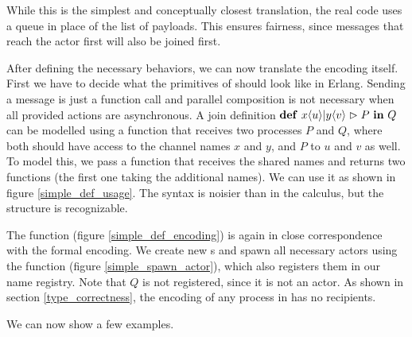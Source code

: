 
While this is the simplest and conceptually closest translation,
the real code uses a queue in place of the list of payloads.
This ensures fairness, since messages that reach the actor first
will also be joined first.


After defining the necessary behaviors,
we can now translate the encoding itself.
First we have to decide what the primitives of \joincalc should look like
in Erlang.
Sending a message is just a function call and parallel composition
is not necessary when all provided actions are asynchronous.
A join definition
$\textbf{\textup{def}} \ x\langle u\rangle | y\langle v\rangle \vartriangleright P \ \textbf{\textup{in}} \ Q$
can be modelled using a function that receives two processes $P$ and $Q$,
where both should have access to the channel names $x$ and $y$,
and $P$ to $u$ and $v$ as well.
To model this, we pass a function that receives the shared names and
returns two functions (the first one taking the additional names).
We can use it as shown in figure \ref{simple_def_usage}.
The syntax is noisier than in the calculus, but the structure is recognizable.


The  function (figure \ref{simple_def_encoding})
is again in close correspondence with the formal encoding.
We create new \actorname{}s and spawn all necessary actors
using the  function (figure \ref{simple_spawn_actor}),
which also registers them in our name registry.
Note that $Q$ is not registered, since it is not an actor.
As shown in section \ref{type_correctness},
the encoding of any process in \joincalc has no recipients.



We can now show a few examples.

